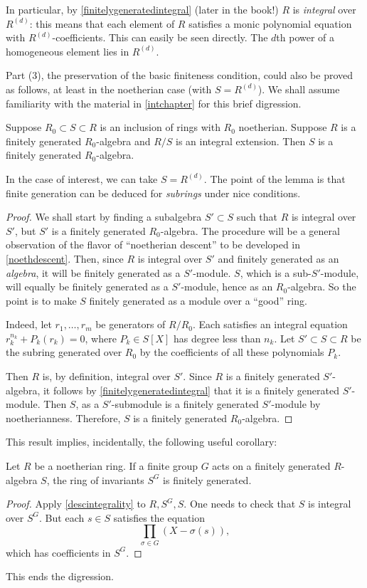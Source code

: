 In particular, by \cref{finitelygeneratedintegral} (later in the book!) $R$ is \emph{integral} over
$R^{(d)}$: this means that each element of $R$ satisfies a monic polynomial
equation with $R^{(d)}$-coefficients. This can easily be seen
directly. The $d$th power of a homogeneous element lies in $R^{(d)}$.  
\begin{remark} 
Part (3), the preservation of the basic finiteness condition, could also be
proved as follows, at least in the noetherian case (with $S = R^{(d)}$). 
We shall assume familiarity with the material in \cref{intchapter} for this
brief digression.
\begin{lemma} \label{descintegrality}
Suppose $R_0 \subset S \subset R$ is an inclusion of rings with $R_0$ noetherian.
Suppose $R$ is a
finitely generated $R_0$-algebra and $R/S$ is an integral extension. Then $S$
is a finitely generated $R_0$-algebra.
\end{lemma} 
In the case of interest, 
we can take $S = R^{(d)}$.
The point of the lemma is that finite generation can be deduced for
\emph{subrings} under nice conditions.
\begin{proof} 
We shall start by finding a subalgebra $S' \subset S$ such that $R$ is
integral over $S'$, but $S'$ is a finitely generated $R_0$-algebra. The
procedure will be a general observation of the flavor of ``noetherian descent''
to be developed in \cref{noethdescent}.
Then, since $R$ is integral over $S'$ and finitely generated as an
\emph{algebra}, it will be finitely generated as a $S'$-module. $S$, which
is a sub-$S'$-module, will equally be finitely generated as a $S'$-module,
hence as an $R_0$-algebra. So the point is to make $S$ finitely generated as a
module over a ``good'' ring.


Indeed, let $r_1, \dots, r_m$ be generators of $R/R_0$. Each satisfies an
integral equation $r_k^{n_k} + P_k(r_k) = 0$, where $P_k \in S[X]$ has degree
less than $n_k$. Let $S' \subset S \subset R$ be the subring generated over $R_0$ by the
coefficients of all these polynomials $P_k$.  

Then $R$ is, by definition, integral over $S'$.
Since $R$ is a finitely generated $S'$-algebra, it follows by
\cref{finitelygeneratedintegral} that it is a finitely generated $S'$-module.
Then $S$, as a $S'$-submodule is a finitely generated $S'$-module by
noetherianness.
Therefore, $S$ is a finitely generated
$R_0$-algebra.
\end{proof} 
This result implies, incidentally, the following useful corollary:

\begin{corollary} Let $R$ be a noetherian ring. If a finite group
$G$ acts on a finitely generated $R$-algebra $S$, the ring of invariants
$S^G$ is finitely generated.
\end{corollary}
\begin{proof} 
Apply \cref{descintegrality} to $R, S^G, S$. One needs to check that $S$ is
integral over $S^G$. But each $s \in S$ satisfies the
equation
\[ \prod_{\sigma \in G} (X - \sigma(s))  ,\]
which has coefficients in $S^G$.
\end{proof} 
This ends the digression.
\end{remark} 


